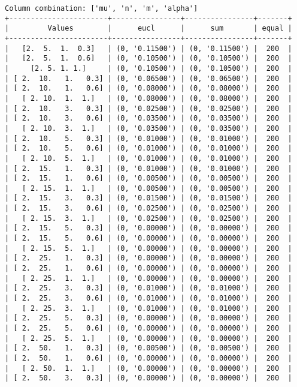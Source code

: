 \documentclass{article}
\begin{document}
\begin{verbatim}
Column combination: ['mu', 'n', 'm', 'alpha']
+-----------------------+----------------+----------------+-------+
|         Values        |      eucl      |      sum       | equal |
+-----------------------+----------------+----------------+-------+
|   [2.  5.  1.  0.3]   | (0, '0.11500') | (0, '0.11500') |  200  |
|   [2.  5.  1.  0.6]   | (0, '0.10500') | (0, '0.10500') |  200  |
|     [2. 5. 1. 1.]     | (0, '0.10500') | (0, '0.10500') |  200  |
| [ 2.  10.   1.   0.3] | (0, '0.06500') | (0, '0.06500') |  200  |
| [ 2.  10.   1.   0.6] | (0, '0.08000') | (0, '0.08000') |  200  |
|   [ 2. 10.  1.  1.]   | (0, '0.08000') | (0, '0.08000') |  200  |
| [ 2.  10.   3.   0.3] | (0, '0.02500') | (0, '0.02500') |  200  |
| [ 2.  10.   3.   0.6] | (0, '0.03500') | (0, '0.03500') |  200  |
|   [ 2. 10.  3.  1.]   | (0, '0.03500') | (0, '0.03500') |  200  |
| [ 2.  10.   5.   0.3] | (0, '0.01000') | (0, '0.01000') |  200  |
| [ 2.  10.   5.   0.6] | (0, '0.01000') | (0, '0.01000') |  200  |
|   [ 2. 10.  5.  1.]   | (0, '0.01000') | (0, '0.01000') |  200  |
| [ 2.  15.   1.   0.3] | (0, '0.01000') | (0, '0.01000') |  200  |
| [ 2.  15.   1.   0.6] | (0, '0.00500') | (0, '0.00500') |  200  |
|   [ 2. 15.  1.  1.]   | (0, '0.00500') | (0, '0.00500') |  200  |
| [ 2.  15.   3.   0.3] | (0, '0.01500') | (0, '0.01500') |  200  |
| [ 2.  15.   3.   0.6] | (0, '0.02500') | (0, '0.02500') |  200  |
|   [ 2. 15.  3.  1.]   | (0, '0.02500') | (0, '0.02500') |  200  |
| [ 2.  15.   5.   0.3] | (0, '0.00000') | (0, '0.00000') |  200  |
| [ 2.  15.   5.   0.6] | (0, '0.00000') | (0, '0.00000') |  200  |
|   [ 2. 15.  5.  1.]   | (0, '0.00000') | (0, '0.00000') |  200  |
| [ 2.  25.   1.   0.3] | (0, '0.00000') | (0, '0.00000') |  200  |
| [ 2.  25.   1.   0.6] | (0, '0.00000') | (0, '0.00000') |  200  |
|   [ 2. 25.  1.  1.]   | (0, '0.00000') | (0, '0.00000') |  200  |
| [ 2.  25.   3.   0.3] | (0, '0.01000') | (0, '0.01000') |  200  |
| [ 2.  25.   3.   0.6] | (0, '0.01000') | (0, '0.01000') |  200  |
|   [ 2. 25.  3.  1.]   | (0, '0.01000') | (0, '0.01000') |  200  |
| [ 2.  25.   5.   0.3] | (0, '0.00000') | (0, '0.00000') |  200  |
| [ 2.  25.   5.   0.6] | (0, '0.00000') | (0, '0.00000') |  200  |
|   [ 2. 25.  5.  1.]   | (0, '0.00000') | (0, '0.00000') |  200  |
| [ 2.  50.   1.   0.3] | (0, '0.00500') | (0, '0.00500') |  200  |
| [ 2.  50.   1.   0.6] | (0, '0.00000') | (0, '0.00000') |  200  |
|   [ 2. 50.  1.  1.]   | (0, '0.00000') | (0, '0.00000') |  200  |
| [ 2.  50.   3.   0.3] | (0, '0.00000') | (0, '0.00000') |  200  |

\end{verbatim}
\end{document}
